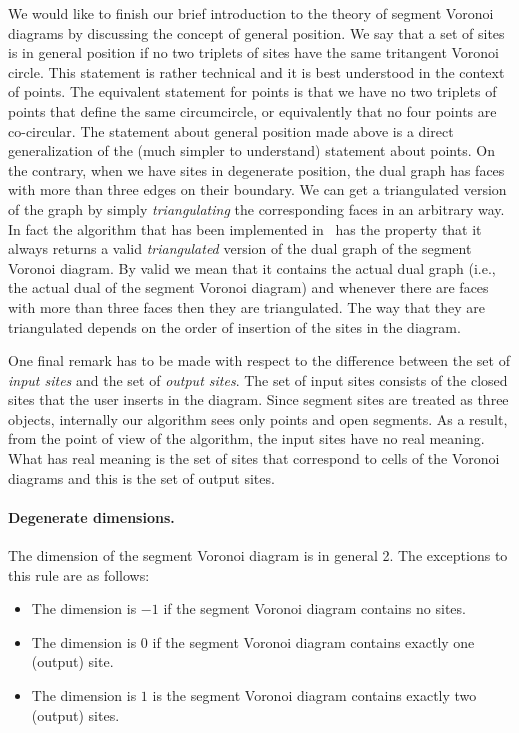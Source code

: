 We would like to finish our brief introduction to the theory of
segment Voronoi diagrams by discussing the concept of general
position. We say that a set of sites is in general position if no two
triplets of sites have the same tritangent Voronoi circle. This
statement is rather technical and it is best understood in the context
of points. The equivalent statement for points is that we have no two
triplets of points that define the same circumcircle, or equivalently
that no four points are co-circular. The statement about general
position made above is a direct generalization of the (much simpler to
understand) statement about points. On the contrary, when we have
sites in degenerate position, the dual graph has faces with more than
three edges on their boundary. We can get a triangulated version of
the graph by simply {\em triangulating} the corresponding faces in an
arbitrary way. In fact the algorithm that has been implemented in
\cgal\ has the property that it always returns a valid
{\em triangulated} version of the dual graph of the segment Voronoi
diagram. By valid we mean that it contains the actual dual graph
(i.e., the actual dual of the segment Voronoi diagram) and whenever
there are faces with more than three faces then they are
triangulated. The way that they are triangulated depends on the order
of insertion of the sites in the diagram.

One final remark has to be made with respect to the difference between
the set of \emph{input sites} and the set of \emph{output sites}. The
set of input sites consists of the closed sites that the user inserts
in the diagram. Since segment sites are treated as three objects,
internally our algorithm sees only points and open segments. As a
result, from the point of view of the algorithm, the input sites have
no real meaning. What has real meaning is the set of sites that
correspond to cells of the Voronoi diagrams and this is the set of
output sites.

\paragraph{Degenerate dimensions.}
The dimension of the segment Voronoi diagram is in general 2. The
exceptions to this rule are as follows:
\begin{itemize}
\item The dimension is $-1$ if the segment Voronoi diagram contains no
  sites.
\item The dimension is $0$ if the segment Voronoi diagram contains exactly
  one (output) site.
\item The dimension is $1$ is the segment Voronoi diagram contains exactly
  two (output) sites.
\end{itemize}


